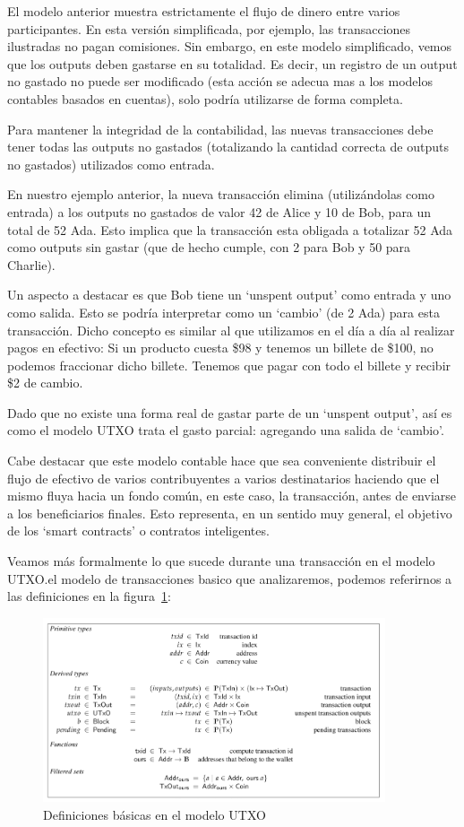 \documentclass[12pt]{book}
\begin{document}
El modelo anterior muestra estrictamente el flujo de dinero entre varios participantes. En esta versión simplificada, por ejemplo, las transacciones ilustradas no pagan comisiones. Sin embargo, en este modelo simplificado, vemos que los outputs deben gastarse en su totalidad. Es decir, un registro de un output no gastado no puede ser modificado (esta acción se adecua mas a los modelos contables basados en cuentas), solo podría utilizarse de forma completa.

Para mantener la integridad de la contabilidad, las nuevas transacciones debe tener todas las outputs no gastados (totalizando la cantidad correcta de outputs no gastados) utilizados como entrada.

En nuestro ejemplo anterior, la nueva transacción elimina (utilizándolas como entrada) a los outputs no gastados de valor 42 de Alice y 10 de Bob, para un total de 52 Ada. Esto implica que la transacción esta obligada a totalizar 52 Ada como outputs sin gastar (que de hecho cumple, con 2 para Bob y 50 para Charlie).

Un aspecto a destacar es que Bob tiene un `unspent output' como entrada y uno como salida. Esto se podría interpretar como un `cambio' (de 2 Ada) para esta transacción. Dicho concepto es similar al que utilizamos en el día a día al realizar pagos en efectivo: Si un producto cuesta \$98 y tenemos un billete de \$100, no podemos fraccionar dicho billete. Tenemos que pagar con todo el billete y recibir \$2 de cambio.

Dado que no existe una forma real de gastar parte de un `unspent output', así es como el modelo UTXO trata el gasto parcial: agregando una salida de `cambio'.

Cabe destacar que este modelo contable hace que sea conveniente distribuir el flujo de efectivo de varios contribuyentes a varios destinatarios haciendo que el mismo fluya hacia un fondo común, en este caso, la transacción, antes de enviarse a los beneficiarios finales. Esto representa, en un sentido muy general, el objetivo de los `smart contracts' o contratos inteligentes.

Veamos más formalmente lo que sucede durante una transacción en el modelo UTXO.\@Para el modelo de transacciones basico que analizaremos, podemos referirnos a las definiciones en la figura~\ref{fig:Basic_UTXO_definitions}:


\begin{figure}[H]
    \centering
    \includegraphics[width=0.9\textwidth]{Basic_UTXO_Definitions.png}
    \caption{Definiciones básicas en el modelo UTXO}\label{fig:Basic_UTXO_definitions}
\end{figure}
\end{document}
